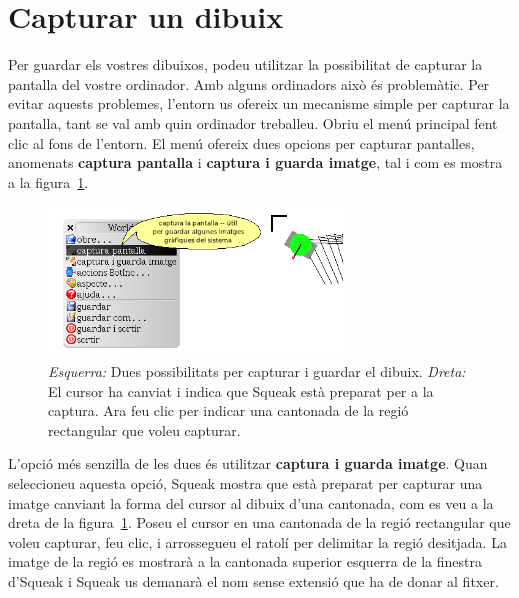 \section{Capturar un dibuix}
Per guardar els vostres dibuixos, podeu utilitzar la possibilitat de capturar la pantalla del vostre ordinador. Amb alguns ordinadors això és problemàtic. Per evitar aquests problemes, l'entorn us ofereix un mecanisme simple per capturar la pantalla, tant se val amb quin ordinador treballeu. Obriu el menú principal fent clic al fons de l'entorn. El menú ofereix dues opcions per capturar pantalles, anomenats \textbf{captura pantalla} i \textbf{captura i guarda imatge}, tal i com es mostra a la figura~\ref{fig0507}.

\begin{figure}[h]
\begin{center}
\includegraphics[height=40mm ,width=80mm ]{Imatges/figura5-7.png}
\end{center}
\caption{\emph{Esquerra:} Dues possibilitats per capturar i guardar el dibuix.
	\emph{Dreta:} El cursor ha canviat i indica que Squeak està preparat per a la captura. Ara feu clic per indicar una cantonada de la regió rectangular que voleu capturar.}
\label{fig0507}
\end{figure}

L'opció més senzilla de les dues és utilitzar  \textbf{captura i guarda imatge}. Quan seleccioneu aquesta opció, Squeak mostra que està preparat per capturar una imatge canviant la forma del cursor al dibuix d'una cantonada, com es veu a la dreta de la figura~\ref{fig0507}. Poseu el cursor en una cantonada de la regió rectangular que voleu capturar, feu clic, i arrossegueu el ratolí per delimitar la regió desitjada. La imatge de la regió es mostrarà a la cantonada superior esquerra de la finestra d'Squeak i Squeak us demanarà el nom sense extensió que ha de donar al fitxer. 

